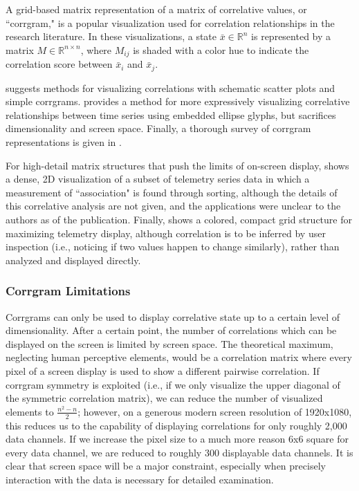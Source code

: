 A grid-based matrix representation of a matrix of correlative values, or ``corrgram," is a popular visualization used for correlation relationships in the research literature. In these visualizations, a state $\bar{x} \in \mathbb{R}^{n}$ is represented by a matrix $M \in \mathbb{R}^{n \times n}$, where $M_{ij}$ is shaded with a color hue to indicate the correlation score between $\bar{x}_{i}$ and $\bar{x}_{j}$.

\cite{yeh2007exploratory} suggests methods for visualizing correlations with schematic scatter plots and simple corrgrams. \cite{murdoch1996graphical} provides a method for more expressively visualizing correlative relationships between time series using embedded ellipse glyphs, but sacrifices dimensionality and screen space. Finally, a thorough survey of corrgram representations is given in \cite{friendly2002corrgrams}. 

For high-detail matrix structures that push the limits of on-screen display, \cite{yairi1992telemetry} shows a dense, 2D visualization of a subset of telemetry series data in which a measurement of ``association" is found through sorting, although the details of this correlative analysis are not given, and the applications were unclear to the authors as of the publication. Finally, \cite{cancro2007interactive} shows a colored, compact grid structure for maximizing telemetry display, although correlation is to be inferred by user inspection (i.e., noticing if two values happen to change similarly), rather than analyzed and displayed directly.

\subsubsection{Corrgram Limitations}

Corrgrams can only be used to display correlative state up to a certain level of dimensionality. After a certain point, the number of correlations which can be displayed on the screen is limited by screen space. The theoretical maximum, neglecting human perceptive elements, would be a correlation matrix where every pixel of a screen display is used to show a different pairwise correlation. If corrgram symmetry is exploited (i.e., if we only visualize the upper diagonal of the symmetric correlation matrix), we can reduce the number of visualized elements to $\frac{n^{2} - n}{2}$; however, on a generous modern screen resolution of 1920x1080, this reduces us to the capability of displaying correlations for only roughly 2,000 data channels. If we increase the pixel size to a much more reason 6x6 square for every data channel, we are reduced to roughly 300 displayable data channels. It is clear that screen space will be a major constraint, especially when precisely interaction with the data is necessary for detailed examination.

